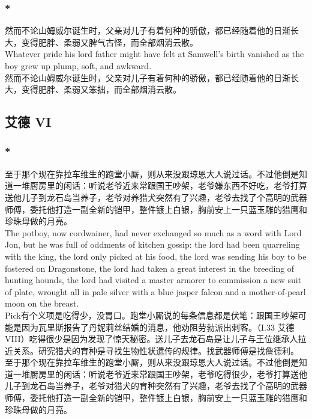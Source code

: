 \documentclass[12pt,a4paper]{article}
\newcommand{\h}[1]{{\color{red}#1}\\}
\newcommand{\la}[1]{{\color{blue}#1}\\}
\begin{document}
\subsubsection{\color{red}*}\la{
	然而不论山姆威尔诞生时，父亲对儿子有着何种的骄傲，都已经随着他的日渐长大，变得肥胖、柔弱又脾气古怪，而全部烟消云散。\\
	Whatever pride his lord father might have felt at Samwell's birth vanished as the boy grew up plump, soft, and awkward.}
	然而不论山姆威尔诞生时，父亲对儿子有着何种的骄傲，都已经随着他的日渐长大，变得肥胖、柔弱又笨拙，而全部烟消云散。
	
\subsection{艾德 VI}	
\subsubsection{\color{red}*}\la{
	至于那个现在靠拉车维生的跑堂小厮，则从来没跟琼恩大人说过话。不过他倒是知道一堆厨房里的闲话：听说老爷近来常跟国王吵架，老爷嫌东西不好吃，老爷打算送他儿子到龙石岛当养子，老爷对养猎犬突然有了兴趣，老爷去找了个高明的武器师傅，委托他打造一副全新的铠甲，整件镀上白银，胸前安上一只蓝玉雕的猎鹰和珍珠母做的月亮。\\
	The potboy, now cordwainer, had never exchanged so much as a word with Lord Jon, but he was full of oddments of kitchen gossip: the lord had been quarreling with the king, the lord only picked at his food, the lord was sending his boy to be fostered on Dragonstone, the lord had taken a great interest in the breeding of hunting hounds, the lord had visited a master armorer to commission a new suit of plate, wrought all in pale silver with a blue jasper falcon and a mother-of-pearl moon on the breast.}\h{
	Pick有个义项是吃得少，没胃口。跑堂小厮说的每条信息都是伏笔：跟国王吵架可能是因为瓦里斯报告了丹妮莉丝结婚的消息，他劝阻劳勃派出刺客。（I.33 艾德 VIII）吃得很少是因为发现了惊天秘密。送儿子去龙石岛是让儿子与王位继承人拉近关系。研究猎犬的育种是寻找生物性状遗传的规律。找武器师傅是找詹德利。}
	至于那个现在靠拉车维生的跑堂小厮，则从来没跟琼恩大人说过话。不过他倒是知道一堆厨房里的闲话：听说老爷近来常跟国王吵架，老爷吃得很少，老爷打算送他儿子到龙石岛当养子，老爷对猎犬的育种突然有了兴趣，老爷去找了个高明的武器师傅，委托他打造一副全新的铠甲，整件镀上白银，胸前安上一只蓝玉雕的猎鹰和珍珠母做的月亮。
\end{document}
